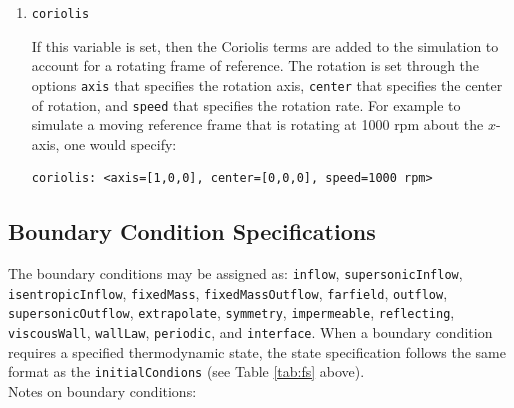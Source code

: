 \documentclass{article}
\begin{document}
\begin{enumerate}
\item {\tt coriolis }

  If this variable is set, then the Coriolis terms are added to the
  simulation to account for a rotating frame of reference.  The
  rotation is set through the options {\tt axis} that specifies the
  rotation axis, {\tt center} that specifies the center of rotation,
  and {\tt speed} that specifies the rotation rate.  For example
  to simulate a moving reference frame that is rotating at 1000 rpm
  about the $x$-axis, one would specify:
\begin{verbatim}
coriolis: <axis=[1,0,0], center=[0,0,0], speed=1000 rpm>
\end{verbatim}
\end{enumerate}

\subsection{Boundary Condition Specifications}


The boundary conditions may be assigned as:
  {\tt inflow}, {\tt supersonicInflow},
  {\tt isentropicInflow}, {\tt fixedMass}, {\tt fixedMassOutflow},
  {\tt farfield}, {\tt outflow}, {\tt supersonicOutflow},
  {\tt extrapolate}, {\tt symmetry}, {\tt impermeable},
  {\tt reflecting}, {\tt viscousWall}, {\tt wallLaw}, {\tt periodic},
  and {\tt interface}.  When a boundary condition requires a specified thermodynamic
  state, the state specification follows the same format as the {\tt initialCondions}
  (see Table \ref{tab:fs} above).\\
  
  Notes on boundary conditions:
\end{document}
